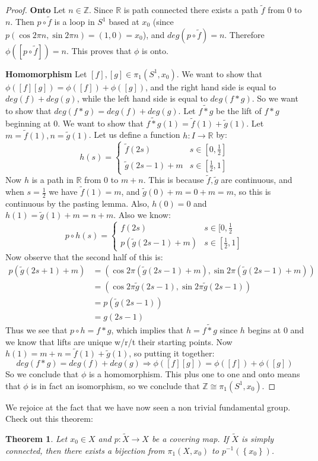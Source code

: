 \documentclass[11pt,reqno]{amsart}
\newtheorem{Theorem}{Theorem}
\theoremstyle{definition}
\begin{document}
\begin{proof}
\par
\textbf{Onto}
\newline
Let $n\in \mathbb{Z}$. Since $\mathbb{R}$ is path connected there exists a path $\tilde{f}$ from $0$ to $n$. Then $p\circ \tilde{f}$ is a loop in $S^1$ based at $x_0$ (since $p(\cos 2\pi n, \sin 2\pi n)=(1,0)=x_0$), and $deg(p\circ \tilde{f})=n$. Therefore $\phi([p\circ \tilde{f}])=n$. This proves that $\phi$ is onto.
\par
\textbf{Homomorphism}
 \newline
Let $[f],[g]\in \pi_1(S^1, x_0)$. We want to show that $\phi([f][g])=\phi([f])+\phi([g])$, and the right hand side is equal to $deg(f)+deg(g)$, while the left hand side is equal to $deg(f\ast g)$. So we want to show that $deg(f\ast g)=deg(f)+deg(g)$. Let $\widetilde{f\ast g}$ be the lift of $f\ast g$ beginning at $0$. We want to show that $\widetilde{f\ast g}(1)=\tilde{f}(1)+\tilde{g}(1)$. Let $m=\tilde{f}(1), n=\tilde{g}(1)$. Let us define a function $h\colon I\to \mathbb{R}$ by:
	\[h(s)=\begin{cases}
	\tilde{f}(2s) & s\in [0,\frac{1}{2}]\\
	\tilde{g}(2s-1)+m & s\in [\frac{1}{2},1]
	\end{cases}
\]
Now $h$ is a path in $\mathbb{R}$ from $0$ to $m+n$. This is because $\tilde{f}, \tilde{g}$ are continuous, and when $s=\frac{1}{2}$ we have $\tilde{f}(1)=m$, and $\tilde{g}(0)+m=0+m=m$, so this is continuous by the pasting lemma. Also, $h(0)=0$ and $h(1)=\tilde{g}(1)+m=n+m$. Also we know:
	\[p\circ h(s)=\begin{cases}
	f(2s) & s\in [0,\frac{1}{2}\\
	p(\tilde{g}(2s-1)+m) & s\in [\frac{1}{2},1]
	\end{cases}
\]
Now observe that the second half of this is:
\begin{align}
	p(\tilde{g}(2s+1)+m)&=(\cos 2\pi (\tilde{g}(2s-1)+m), \sin2\pi (\tilde{g}(2s-1)+m))\\
											&=(\cos 2\pi \tilde{g}(2s-1),\sin2\pi \tilde{g}(2s-1))\\
											&=p(\tilde{g}(2s-1))\\
											&=g(2s-1)						
\end{align}
Thus we see that $p\circ h=f\ast g$, which implies that $h=\widetilde{f\ast g}$ since $h$ begins at $0$ and we know that lifts are unique w/r/t their starting points. Now $h(1)=m+n=\tilde{f}(1)+\tilde{g}(1)$, so putting it together:
	\[deg(f\ast g)=deg(f)+deg(g)\Rightarrow \phi([f][g])=\phi([f])+\phi([g])
\]
So we conclude that $\phi$ is a homomorphism. This plus one to one and onto means that $\phi$ is in fact an isomorphism, so we conclude that $\mathbb{Z}\cong \pi_1(S^1,x_0)$.
\end{proof}
\par
We rejoice at the fact that we have now seen a non trivial fundamental group. Check out this theorem:
\begin{Theorem}
Let $x_0\in X$ and $p\colon \tilde{X}\to X$ be a covering map. If $\tilde{X}$ is simply connected, then there exists a bijection from $\pi_1(X,x_0)$ to $p^{-1}(\left\{x_0\right\})$.
\end{Theorem}
\end{document}
